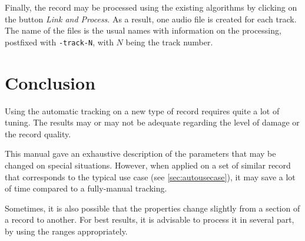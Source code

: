Finally, the record may be processed using the existing algorithms by clicking on the button \emph{Link and Process}. As a result, one audio file is created for each track. The name of the files is the usual names with information on the processing, postfixed with \texttt{-track-N}, with $N$ being the track number.

\section{Conclusion}

Using the automatic tracking on a new type of record requires quite a lot of tuning. The results may or may not be adequate regarding the level of damage or the record quality.

This manual gave an exhaustive description of the parameters that may be changed on special situations. However, when applied on a set of similar record that corresponds to the typical use case (see \autoref{sec:autousecase}), it may save a lot of time compared to a fully-manual tracking.

Sometimes, it is also possible that the properties change slightly from a section of a record to another. For best results, it is advisable to process it in several part, by using the ranges appropriately.